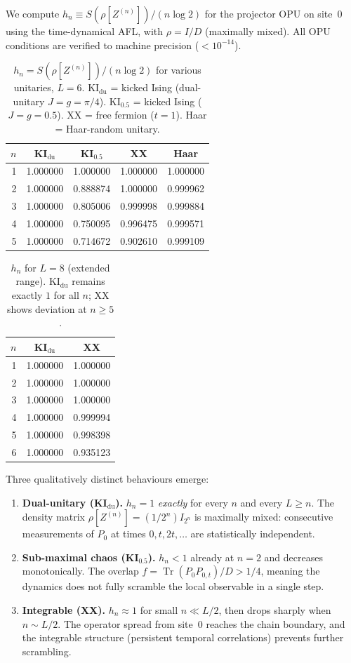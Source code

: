 \documentclass[12pt,a4paper]{article}
\begin{document}
We compute $h_n \equiv S(\rho[Z^{(n)}])/(n\log 2)$ for the projector OPU
on site~0 using the time-dynamical AFL, with $\rho=I/D$ (maximally mixed).
All OPU conditions are verified to machine precision ($<10^{-14}$).

\begin{table}[h]
\centering
\caption{$h_n = S(\rho[Z^{(n)}])/(n\log 2)$ for various unitaries, $L=6$.
KI$_{\mathrm{du}}$ = kicked Ising (dual-unitary $J=g=\pi/4$).
KI$_{0.5}$ = kicked Ising ($J=g=0.5$).
XX = free fermion ($t=1$). Haar = Haar-random unitary.}
\begin{tabular}{r|cccc}
\hline
$n$ & KI$_{\mathrm{du}}$ & KI$_{0.5}$ & XX & Haar \\
\hline
1 & 1.000000 & 1.000000 & 1.000000 & 1.000000 \\
2 & 1.000000 & 0.888874 & 1.000000 & 0.999962 \\
3 & 1.000000 & 0.805006 & 0.999998 & 0.999884 \\
4 & 1.000000 & 0.750095 & 0.996475 & 0.999571 \\
5 & 1.000000 & 0.714672 & 0.902610 & 0.999109 \\
\hline
\end{tabular}
\label{tab:hn_L6}
\end{table}

\begin{table}[h]
\centering
\caption{$h_n$ for $L=8$ (extended range).
KI$_{\mathrm{du}}$ remains exactly $1$ for all $n$; XX shows deviation at $n\geq 5$.}
\begin{tabular}{r|cc}
\hline
$n$ & KI$_{\mathrm{du}}$ & XX \\
\hline
1 & 1.000000 & 1.000000 \\
2 & 1.000000 & 1.000000 \\
3 & 1.000000 & 1.000000 \\
4 & 1.000000 & 0.999994 \\
5 & 1.000000 & 0.998398 \\
6 & 1.000000 & 0.935123 \\
\hline
\end{tabular}
\label{tab:hn_L8}
\end{table}

Three qualitatively distinct behaviours emerge:
\begin{enumerate}
\item \textbf{Dual-unitary (KI$_{\mathrm{du}}$).}
$h_n=1$ \emph{exactly} for every $n$ and every $L\geq n$.
The density matrix $\rho[Z^{(n)}]=(1/2^n)I_{2^n}$ is maximally mixed:
consecutive measurements of $P_0$ at times $0,t,2t,\ldots$ are
statistically independent.
\item \textbf{Sub-maximal chaos (KI$_{0.5}$).}
$h_n<1$ already at $n=2$ and decreases monotonically.
The overlap $f=\operatorname{Tr}(P_0P_{0,t})/D>1/4$, meaning the dynamics
does not fully scramble the local observable in a single step.
\item \textbf{Integrable (XX).}
$h_n\approx 1$ for small $n\ll L/2$, then drops sharply when $n\sim L/2$.
The operator spread from site~0 reaches the chain boundary, and the integrable
structure (persistent temporal correlations) prevents further scrambling.
\end{enumerate}
\end{document}
